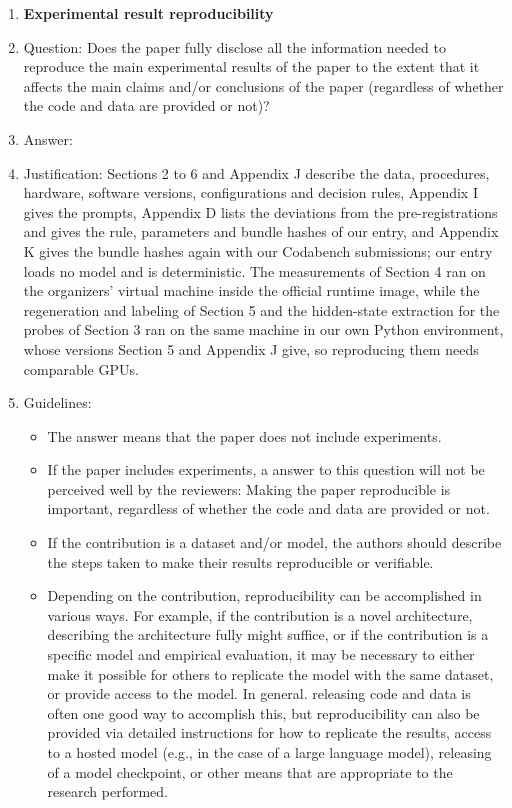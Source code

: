 \begin{enumerate}
    \item {\bf Experimental result reproducibility}
    \item[] Question: Does the paper fully disclose all the information needed to reproduce the main experimental results of the paper to the extent that it affects the main claims and/or conclusions of the paper (regardless of whether the code and data are provided or not)?
    \item[] Answer: \answerYes{}
    \item[] Justification: Sections 2 to 6 and Appendix J describe the data, procedures, hardware, software versions, configurations and decision rules, Appendix I gives the prompts, Appendix D lists the deviations from the pre-registrations and gives the rule, parameters and bundle hashes of our entry, and Appendix K gives the bundle hashes again with our Codabench submissions; our entry loads no model and is deterministic. The measurements of Section 4 ran on the organizers' virtual machine inside the official runtime image, while the regeneration and labeling of Section 5 and the hidden-state extraction for the probes of Section 3 ran on the same machine in our own Python environment, whose versions Section 5 and Appendix J give, so reproducing them needs comparable GPUs.
    \item[] Guidelines:
    \begin{itemize}
        \item The answer \answerNA{} means that the paper does not include experiments.
        \item If the paper includes experiments, a \answerNo{} answer to this question will not be perceived well by the reviewers: Making the paper reproducible is important, regardless of whether the code and data are provided or not.
        \item If the contribution is a dataset and\slash or model, the authors should describe the steps taken to make their results reproducible or verifiable. 
        \item Depending on the contribution, reproducibility can be accomplished in various ways. For example, if the contribution is a novel architecture, describing the architecture fully might suffice, or if the contribution is a specific model and empirical evaluation, it may be necessary to either make it possible for others to replicate the model with the same dataset, or provide access to the model. In general. releasing code and data is often one good way to accomplish this, but reproducibility can also be provided via detailed instructions for how to replicate the results, access to a hosted model (e.g., in the case of a large language model), releasing of a model checkpoint, or other means that are appropriate to the research performed.

\end{itemize}
\end{enumerate}
